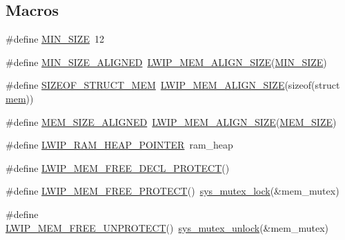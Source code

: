 \subsection*{Macros}
\begin{DoxyCompactItemize}
\item 
\#define \hyperlink{openmote-cc2538_2lwip_2src_2core_2mem_8c_a278694c2333c9826f21ddd2c2d220f66}{M\+I\+N\+\_\+\+S\+I\+ZE}~12
\item 
\#define \hyperlink{openmote-cc2538_2lwip_2src_2core_2mem_8c_a97c704b85f71b6e61b0098b4a0a743cd}{M\+I\+N\+\_\+\+S\+I\+Z\+E\+\_\+\+A\+L\+I\+G\+N\+ED}~\hyperlink{group__compiler__abstraction_gaef204be511fd32f681b55abc08e9ae18}{L\+W\+I\+P\+\_\+\+M\+E\+M\+\_\+\+A\+L\+I\+G\+N\+\_\+\+S\+I\+ZE}(\hyperlink{openmote-cc2538_2lwip_2src_2core_2mem_8c_a278694c2333c9826f21ddd2c2d220f66}{M\+I\+N\+\_\+\+S\+I\+ZE})
\item 
\#define \hyperlink{openmote-cc2538_2lwip_2src_2core_2mem_8c_ade9cedd48e9a482120e29c010352ee5c}{S\+I\+Z\+E\+O\+F\+\_\+\+S\+T\+R\+U\+C\+T\+\_\+\+M\+EM}~\hyperlink{group__compiler__abstraction_gaef204be511fd32f681b55abc08e9ae18}{L\+W\+I\+P\+\_\+\+M\+E\+M\+\_\+\+A\+L\+I\+G\+N\+\_\+\+S\+I\+ZE}(sizeof(struct \hyperlink{structmem}{mem}))
\item 
\#define \hyperlink{openmote-cc2538_2lwip_2src_2core_2mem_8c_a78ed2097d5d3e2ca4599b2ca3d91493a}{M\+E\+M\+\_\+\+S\+I\+Z\+E\+\_\+\+A\+L\+I\+G\+N\+ED}~\hyperlink{group__compiler__abstraction_gaef204be511fd32f681b55abc08e9ae18}{L\+W\+I\+P\+\_\+\+M\+E\+M\+\_\+\+A\+L\+I\+G\+N\+\_\+\+S\+I\+ZE}(\hyperlink{openmote-cc2538_2lwip_2test_2unit_2lwipopts_8h_a2dcf8c45f945dd0c4301a94700f2112c}{M\+E\+M\+\_\+\+S\+I\+ZE})
\item 
\#define \hyperlink{openmote-cc2538_2lwip_2src_2core_2mem_8c_a4fa8ffb4c7a8b4c0404ad4278cc801d0}{L\+W\+I\+P\+\_\+\+R\+A\+M\+\_\+\+H\+E\+A\+P\+\_\+\+P\+O\+I\+N\+T\+ER}~ram\+\_\+heap
\item 
\#define \hyperlink{openmote-cc2538_2lwip_2src_2core_2mem_8c_a581c4edded02d92caf7a938c801a618e}{L\+W\+I\+P\+\_\+\+M\+E\+M\+\_\+\+F\+R\+E\+E\+\_\+\+D\+E\+C\+L\+\_\+\+P\+R\+O\+T\+E\+CT}()
\item 
\#define \hyperlink{openmote-cc2538_2lwip_2src_2core_2mem_8c_aef413072690259b59ce27e49df19e307}{L\+W\+I\+P\+\_\+\+M\+E\+M\+\_\+\+F\+R\+E\+E\+\_\+\+P\+R\+O\+T\+E\+CT}()~\hyperlink{group__sys__mutex_ga4d4eb9afe5965fa2661dd54ff55d616a}{sys\+\_\+mutex\+\_\+lock}(\&mem\+\_\+mutex)
\item 
\#define \hyperlink{openmote-cc2538_2lwip_2src_2core_2mem_8c_aa8a24c0593943bb1e64c1243dddfae50}{L\+W\+I\+P\+\_\+\+M\+E\+M\+\_\+\+F\+R\+E\+E\+\_\+\+U\+N\+P\+R\+O\+T\+E\+CT}()~\hyperlink{group__sys__mutex_ga5568f68898fe9d5735f9ce2f665624fb}{sys\+\_\+mutex\+\_\+unlock}(\&mem\+\_\+mutex)

\end{DoxyCompactItemize}
